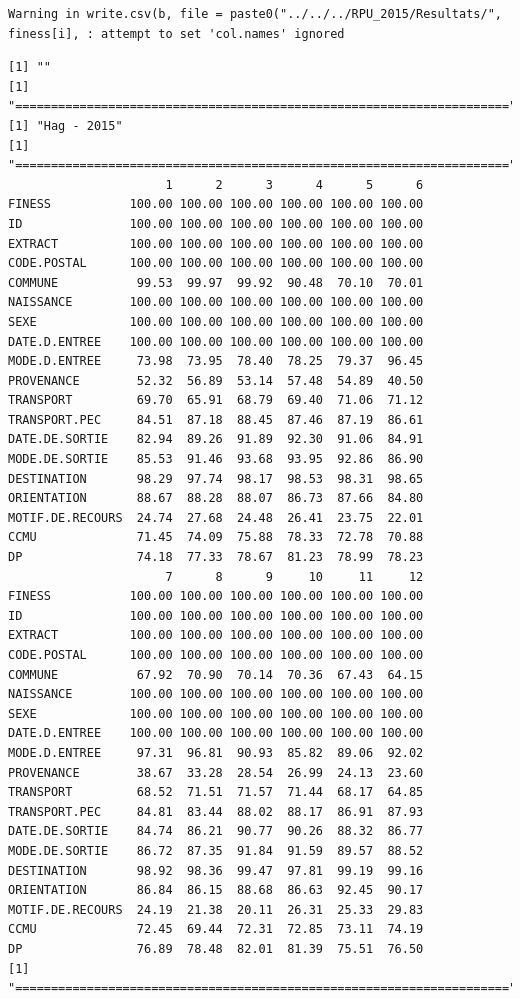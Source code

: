 \documentclass[]{article}
\begin{document}
\begin{verbatim}
Warning in write.csv(b, file = paste0("../../../RPU_2015/Resultats/",
finess[i], : attempt to set 'col.names' ignored
\end{verbatim}

\begin{verbatim}
[1] ""
[1] "====================================================================="
[1] "Hag - 2015"
[1] "====================================================================="
                      1      2      3      4      5      6
FINESS           100.00 100.00 100.00 100.00 100.00 100.00
ID               100.00 100.00 100.00 100.00 100.00 100.00
EXTRACT          100.00 100.00 100.00 100.00 100.00 100.00
CODE.POSTAL      100.00 100.00 100.00 100.00 100.00 100.00
COMMUNE           99.53  99.97  99.92  90.48  70.10  70.01
NAISSANCE        100.00 100.00 100.00 100.00 100.00 100.00
SEXE             100.00 100.00 100.00 100.00 100.00 100.00
DATE.D.ENTREE    100.00 100.00 100.00 100.00 100.00 100.00
MODE.D.ENTREE     73.98  73.95  78.40  78.25  79.37  96.45
PROVENANCE        52.32  56.89  53.14  57.48  54.89  40.50
TRANSPORT         69.70  65.91  68.79  69.40  71.06  71.12
TRANSPORT.PEC     84.51  87.18  88.45  87.46  87.19  86.61
DATE.DE.SORTIE    82.94  89.26  91.89  92.30  91.06  84.91
MODE.DE.SORTIE    85.53  91.46  93.68  93.95  92.86  86.90
DESTINATION       98.29  97.74  98.17  98.53  98.31  98.65
ORIENTATION       88.67  88.28  88.07  86.73  87.66  84.80
MOTIF.DE.RECOURS  24.74  27.68  24.48  26.41  23.75  22.01
CCMU              71.45  74.09  75.88  78.33  72.78  70.88
DP                74.18  77.33  78.67  81.23  78.99  78.23
                      7      8      9     10     11     12
FINESS           100.00 100.00 100.00 100.00 100.00 100.00
ID               100.00 100.00 100.00 100.00 100.00 100.00
EXTRACT          100.00 100.00 100.00 100.00 100.00 100.00
CODE.POSTAL      100.00 100.00 100.00 100.00 100.00 100.00
COMMUNE           67.92  70.90  70.14  70.36  67.43  64.15
NAISSANCE        100.00 100.00 100.00 100.00 100.00 100.00
SEXE             100.00 100.00 100.00 100.00 100.00 100.00
DATE.D.ENTREE    100.00 100.00 100.00 100.00 100.00 100.00
MODE.D.ENTREE     97.31  96.81  90.93  85.82  89.06  92.02
PROVENANCE        38.67  33.28  28.54  26.99  24.13  23.60
TRANSPORT         68.52  71.51  71.57  71.44  68.17  64.85
TRANSPORT.PEC     84.81  83.44  88.02  88.17  86.91  87.93
DATE.DE.SORTIE    84.74  86.21  90.77  90.26  88.32  86.77
MODE.DE.SORTIE    86.72  87.35  91.84  91.59  89.57  88.52
DESTINATION       98.92  98.36  99.47  97.81  99.19  99.16
ORIENTATION       86.84  86.15  88.68  86.63  92.45  90.17
MOTIF.DE.RECOURS  24.19  21.38  20.11  26.31  25.33  29.83
CCMU              72.45  69.44  72.31  72.85  73.11  74.19
DP                76.89  78.48  82.01  81.39  75.51  76.50
[1] "====================================================================="
\end{verbatim}
\end{document}

